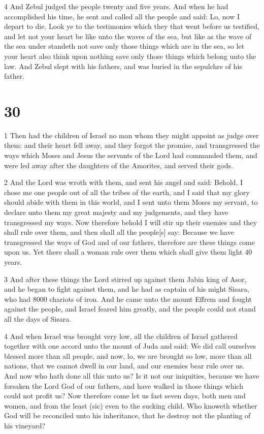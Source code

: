 \par 4 And Zebul judged the people twenty and five years. And when he had accomplished his time, he sent and called all the people and said: Lo, now I depart to die. Look ye to the testimonies which they that went before us testified, and let not your heart be like unto the waves of the sea, but like as the wave of the sea under standeth not save only those things which are in the sea, so let your heart also think upon nothing save only those things which belong unto the law. And Zebul slept with his fathers, and was buried in the sepulchre of his father.

\chapter{30}

\par 1 Then had the children of Israel no man whom they might appoint as judge over them: and their heart fell away, and they forgot the promise, and transgressed the ways which Moses and Jesus the servants of the Lord had commanded them, and were led away after the daughters of the Amorites, and served their gods. 

\par 2 And the Lord was wroth with them, and sent his angel and said: Behold, I chose me one people out of all the tribes of the earth, and I said that my glory should abide with them in this world, and I sent unto them Moses my servant, to declare unto them my great majesty and my judgements, and they have transgressed my ways. Now therefore behold I will stir up their enemies and they shall rule over them, and then shall all the people[s] say: Because we have transgressed the ways of God and of our fathers, therefore are these things come upon us. Yet there shall a woman rule over them which shall give them light 40 years.

\par 3 And after these things the Lord stirred up against them Jabin king of Asor, and he began to fight against them, and he had as captain of his might Sisara, who had 8000 chariots of iron. And he came unto the mount Effrem and fought against the people, and Israel feared him greatly, and the people could not stand all the days of Sisara.

\par 4 And when Israel was brought very low, all the children of Israel gathered together with one accord unto the mount of Juda and said: We did call ourselves blessed more than all people, and now, lo, we are brought so low, more than all nations, that we cannot dwell in our land, and our enemies bear rule over us. And now who hath done all this unto us? Is it not our iniquities, because we have forsaken the Lord God of our fathers, and have walked in those things which could not profit us? Now therefore come let us fast seven days, both men and women, and from the least (sic) even to the sucking child. Who knoweth whether God will be reconciled unto his inheritance, that he destroy not the planting of his vineyard?

